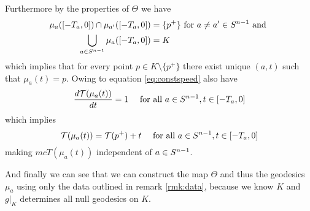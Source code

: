 Furthermore by the properties of $\Theta$ we have 
\begin{align}
    \mu_a([-T_a,0])\cap \mu_{a'}([-T_a,0]) &= \{p^+\} \text{ for } a\neq a'\in {S^{n-1}} \text{ and }\\
    \bigcup_{a\in {S^{n-1}}}\mu_a([-T_a,0]) &= K
\end{align} which implies that for every point $p\in K\setminus \{p^+\}$ there exist unique $(a,t)$ such that $\mu_a(t)=p$. Owing to equation \ref{eq:constspeed} also have 
\begin{equation}\label{eq:muspeed}
    \frac{d{\mathcal{T}}(\mu_a(t))}{dt} = 1 \quad \text{ for all }a\in {S^{n-1}}, t\in [-T_a,0]
\end{equation}which implies 
\begin{equation}\label{eq:Teq}
    {\mathcal{T}}(\mu_a(t)) = {\mathcal{T}}(p^+)+t \quad \text{ for all }a\in {S^{n-1}}, t\in [-T_a,0]
\end{equation} making $mc{T}(\mu_a(t))$ independent of $a\in {S^{n-1}}$.

And finally we can see that we can construct the map $\Theta$ and thus the geodesics $\mu_a$ using only the data outlined in remark \ref{rmk:data}, because we know $K$ and $g\rvert_K$ determines all null geodesics on $K$.


